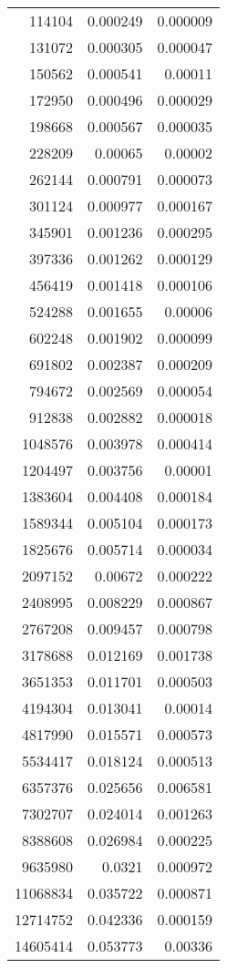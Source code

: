 \begin{longtable}{r r r}
114104 & 0.000249 & 0.000009 \\
131072 & 0.000305 & 0.000047 \\
150562 & 0.000541 & 0.00011 \\
172950 & 0.000496 & 0.000029 \\
198668 & 0.000567 & 0.000035 \\
228209 & 0.00065 & 0.00002 \\
262144 & 0.000791 & 0.000073 \\
301124 & 0.000977 & 0.000167 \\
345901 & 0.001236 & 0.000295 \\
397336 & 0.001262 & 0.000129 \\
456419 & 0.001418 & 0.000106 \\
524288 & 0.001655 & 0.00006 \\
602248 & 0.001902 & 0.000099 \\
691802 & 0.002387 & 0.000209 \\
794672 & 0.002569 & 0.000054 \\
912838 & 0.002882 & 0.000018 \\
1048576 & 0.003978 & 0.000414 \\
1204497 & 0.003756 & 0.00001 \\
1383604 & 0.004408 & 0.000184 \\
1589344 & 0.005104 & 0.000173 \\
1825676 & 0.005714 & 0.000034 \\
2097152 & 0.00672 & 0.000222 \\
2408995 & 0.008229 & 0.000867 \\
2767208 & 0.009457 & 0.000798 \\
3178688 & 0.012169 & 0.001738 \\
3651353 & 0.011701 & 0.000503 \\
4194304 & 0.013041 & 0.00014 \\
4817990 & 0.015571 & 0.000573 \\
5534417 & 0.018124 & 0.000513 \\
6357376 & 0.025656 & 0.006581 \\
7302707 & 0.024014 & 0.001263 \\
8388608 & 0.026984 & 0.000225 \\
9635980 & 0.0321 & 0.000972 \\
11068834 & 0.035722 & 0.000871 \\
12714752 & 0.042336 & 0.000159 \\
14605414 & 0.053773 & 0.00336 \\

\end{longtable}
